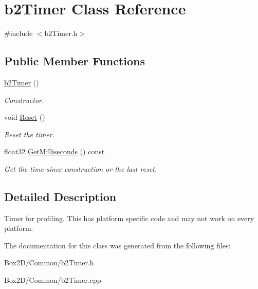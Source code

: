 \hypertarget{classb2_timer}{}\section{b2\+Timer Class Reference}
\label{classb2_timer}


{\ttfamily \#include $<$b2\+Timer.\+h$>$}

\subsection*{Public Member Functions}
\begin{DoxyCompactItemize}
\item 
\mbox{\label{classb2_timer_afcc159032a8edeaa9febdf2b6cbd49a5}} 
\hyperlink{classb2_timer_afcc159032a8edeaa9febdf2b6cbd49a5}{b2\+Timer} ()
\begin{DoxyCompactList}\small\item\em Constructor. \end{DoxyCompactList}\item 
\mbox{\label{classb2_timer_a367388794588e9283600437be82f2889}} 
void \hyperlink{classb2_timer_a367388794588e9283600437be82f2889}{Reset} ()
\begin{DoxyCompactList}\small\item\em Reset the timer. \end{DoxyCompactList}\item 
\mbox{\label{classb2_timer_a15fd1aaa83a9d58cc004c852df71abb3}} 
float32 \hyperlink{classb2_timer_a15fd1aaa83a9d58cc004c852df71abb3}{Get\+Milliseconds} () const
\begin{DoxyCompactList}\small\item\em Get the time since construction or the last reset. \end{DoxyCompactList}\end{DoxyCompactItemize}


\subsection{Detailed Description}
Timer for profiling. This has platform specific code and may not work on every platform. 

The documentation for this class was generated from the following files\+:\begin{DoxyCompactItemize}
\item 
Box2\+D/\+Common/b2\+Timer.\+h\item 
Box2\+D/\+Common/b2\+Timer.\+cpp\end{DoxyCompactItemize}
